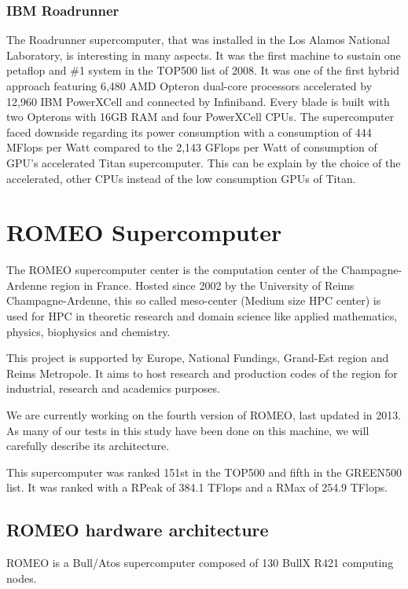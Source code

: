 \subsubsection{IBM Roadrunner}
The Roadrunner supercomputer, that was installed in the Los Alamos National Laboratory, is interesting in many aspects. 
It was the first machine to sustain one petaflop and \#1 system in the TOP500 list of 2008. 
It was one of the first hybrid approach featuring 6,480 AMD Opteron dual-core processors accelerated by 12,960 IBM PowerXCell and connected by Infiniband. 
Every blade is built with two Opterons with 16GB RAM and four PowerXCell CPUs. 
The supercomputer faced downside regarding its power consumption with a consumption of 444 MFlops per Watt compared to the 2,143 GFlops per Watt of consumption of GPU's accelerated Titan supercomputer.
This can be explain by the choice of the accelerated, other CPUs instead of the low consumption GPUs of Titan.

\section{ROMEO Supercomputer}
The ROMEO supercomputer center is the computation center of the Champagne-Ardenne region in France. 
Hosted since 2002 by the University of Reims Champagne-Ardenne, this so called meso-center (Medium size HPC center) is used for HPC in theoretic research and domain science like applied mathematics, physics, biophysics and chemistry. 

This project is supported by Europe, National Fundings, Grand-Est region and Reims Metropole. 
It aims to host research and production codes of the region for industrial, research and academics purposes. 

We are currently working on the fourth version of ROMEO, last updated in 2013. 
As many of our tests in this study have been done on this machine, we will carefully describe its architecture. 

This supercomputer was ranked 151st in the TOP500 and fifth in the GREEN500 list.
It was ranked with a RPeak of 384.1 TFlops and a RMax of 254.9 TFlops.

\subsection{ROMEO hardware architecture}
\label{sec:part1_ROMEO}
ROMEO is a Bull/Atos supercomputer composed of 130 BullX R421 computing nodes. 


